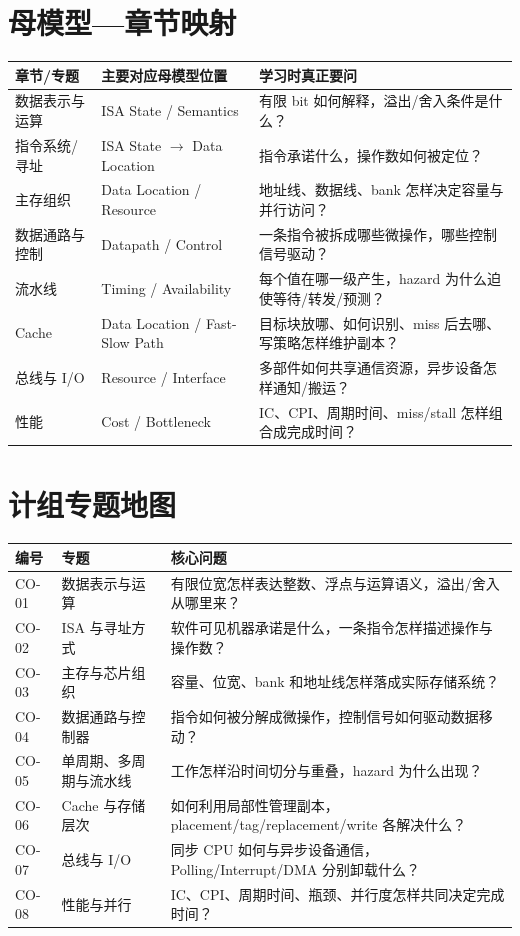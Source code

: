 \documentclass[11pt,a4paper,openany]{ctexbook}
\begin{document}
\section{母模型—章节映射}
\begin{longtable}{L{3.0cm}L{4.2cm}L{\dimexpr\linewidth-8.47cm\relax}}
\toprule
\textbf{章节/专题} & \textbf{主要对应母模型位置} & \textbf{学习时真正要问}\\
\midrule
数据表示与运算 & ISA State / Semantics & 有限 bit 如何解释，溢出/舍入条件是什么？\\
指令系统/寻址 & ISA State $\to$ Data Location & 指令承诺什么，操作数如何被定位？\\
主存组织 & Data Location / Resource & 地址线、数据线、bank 怎样决定容量与并行访问？\\
数据通路与控制 & Datapath / Control & 一条指令被拆成哪些微操作，哪些控制信号驱动？\\
流水线 & Timing / Availability & 每个值在哪一级产生，hazard 为什么迫使等待/转发/预测？\\
Cache & Data Location / Fast-Slow Path & 目标块放哪、如何识别、miss 后去哪、写策略怎样维护副本？\\
总线与 I/O & Resource / Interface & 多部件如何共享通信资源，异步设备怎样通知/搬运？\\
性能 & Cost / Bottleneck & IC、CPI、周期时间、miss/stall 怎样组合成完成时间？\\
\bottomrule
\end{longtable}

\section{计组专题地图}
\begin{longtable}{L{1.45cm}L{4.45cm}L{\dimexpr\linewidth-7.17cm\relax}}
\toprule
\textbf{编号} & \textbf{专题} & \textbf{核心问题}\\
\midrule
CO-01 & 数据表示与运算 & 有限位宽怎样表达整数、浮点与运算语义，溢出/舍入从哪里来？\\
CO-02 & ISA 与寻址方式 & 软件可见机器承诺是什么，一条指令怎样描述操作与操作数？\\
CO-03 & 主存与芯片组织 & 容量、位宽、bank 和地址线怎样落成实际存储系统？\\
CO-04 & 数据通路与控制器 & 指令如何被分解成微操作，控制信号如何驱动数据移动？\\
CO-05 & 单周期、多周期与流水线 & 工作怎样沿时间切分与重叠，hazard 为什么出现？\\
CO-06 & Cache 与存储层次 & 如何利用局部性管理副本，placement/tag/replacement/write 各解决什么？\\
CO-07 & 总线与 I/O & 同步 CPU 如何与异步设备通信，Polling/Interrupt/DMA 分别卸载什么？\\
CO-08 & 性能与并行 & IC、CPI、周期时间、瓶颈、并行度怎样共同决定完成时间？\\
\bottomrule
\end{longtable}
\end{document}
